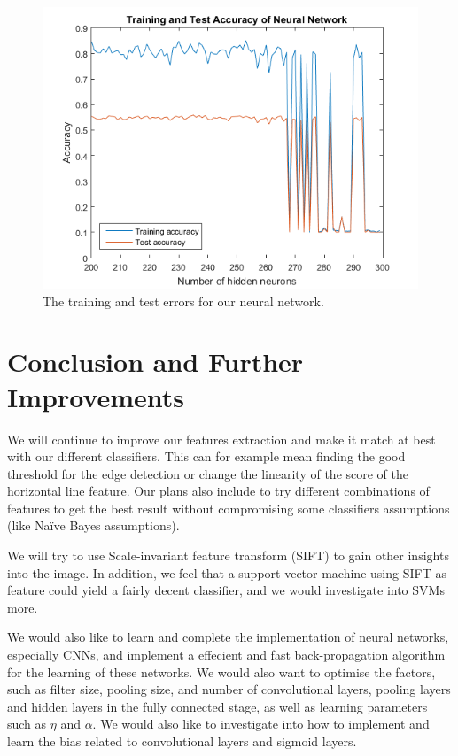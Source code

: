 \documentclass{article} %
\begin{document}
\begin{figure}
\centering
\includegraphics{fig1.png}
\caption{The training and test errors for our neural network.}
\end{figure}




\section{Conclusion and Further Improvements}
We will continue to improve our features extraction and make it match at best with our different classifiers. This can for example mean finding the good threshold for the edge detection or change the linearity of the score of the horizontal line feature. Our plans also include to try different combinations of features to get the best result without compromising some classifiers assumptions (like Na\"ive Bayes assumptions).

We will try to use Scale-invariant feature transform (SIFT) to gain other insights into the image. In addition, we feel that a support-vector machine using SIFT as feature could yield a fairly decent classifier, and we would investigate into SVMs more.

We would also like to learn and complete the implementation of neural networks, especially CNNs, and implement a effecient and fast back-propagation algorithm for the learning of these networks. We would also want to optimise the factors, such as filter size, pooling size, and number of convolutional layers, pooling layers and hidden layers in the fully connected stage, as well as learning parameters such as $\eta$ and $\alpha$. We would also like to investigate into how to implement and learn the bias related to convolutional layers and sigmoid layers.
\end{document}

